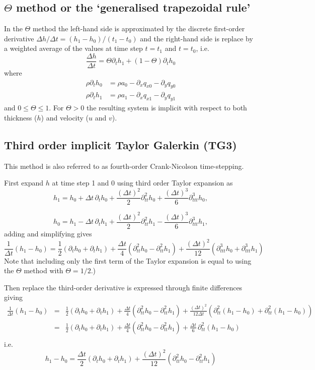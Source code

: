 \documentclass[10pt,a4paper]{book}
\newcommand{\p}{\partial}
\begin{document}
\subsection{$\Theta$ method or the `generalised trapezoidal rule'}

In the $\Theta$ method the left-hand side is approximated by the 
discrete first-order derivative $\Delta h/\Delta t=(h_1-h_0)/(t_1-t_0)$
and the right-hand side is replace by a weighted average of the values at time step $t=t_1$ and $t=t_0$, i.e.\
\[ \frac{\Delta h}{\Delta t}= \Theta \p_t h_1 +(1-\Theta) \p_t h_0  \]
where
\begin{align*}
\rho \p_t h_0&=\rho a_0-\p_x q_{x0} - \p_y q_{y0}\\
\rho \p_t h_1&=\rho a_1-\p_x q_{x1} - \p_y q_{y1}
\end{align*}
and $0 \le \Theta \le 1$. For $\Theta>0$ the resulting system is
implicit with respect to both thickness ($h$) and velocity ($u$ and
$v$).


\subsection{Third order implicit Taylor Galerkin (TG3)}
This method is also referred to as fourth-order Crank-Nicolson time-stepping.


First expand $h$ at time step 1 and 0 using third order Taylor expansion as
\[
h_1=h_0+ \Delta t \, \p_t h_0 + \frac{(\Delta t)^2}{2} \p^2_{tt} h_0 + \frac{(\Delta t)^3}{6} \p^3_{ttt} h_0 ,
\] 

\[
h_0=h_1- \Delta t \, \p_t h_1 + \frac{(\Delta t)^2}{2} \p^2_{tt} h_1  - \frac{(\Delta t)^3}{6} \p^3_{ttt} h_1,
\] 
adding and simplifying gives
\begin{equation}
\frac{1}{\Delta t}(h_1-h_0)= \frac{1}{2} (\p_t h_0+ \p_t h_1) + \frac{\Delta t}{4} (\p^2_{tt} h_0 - \p^2_{tt} h_1)
+\frac{(\Delta t)^2}{12} ( \p^3_{ttt} h_0 + \p^3_{ttt} h_1) 
\label{eq:fDt}
\end{equation}
Note that including  only the first term of the Taylor expansion is equal to using the $\Theta$ method with $\Theta=1/2$.)


Then replace the third-order derivative is expressed through finite differences giving
\begin{eqnarray*}
\frac{1}{\Delta t}(h_1-h_0)&=& 
\frac{1}{2} (\p_t h_0+ \p_t h_1) + \frac{\Delta t}{4} (\p^2_{tt} h_0 - \p^2_{tt} h_1) +\frac{(\Delta t)^2}{12 \Delta t} ( \p^2_{tt} (h_1-h_0) + \p^2_{tt} (h_1-h_0)) \\
&=& \frac{1}{2} (\p_t h_0+ \p_t h_1) + \frac{\Delta t}{4} (\p^2_{tt} h_0 - \p^2_{tt} h_1) +\frac{\Delta t}{6} \,\p^2_{tt} (h_1-h_0)  \\
\end{eqnarray*}
i.e.
\begin{equation}
h_1-h_0 =  \frac{\Delta t}{2} (\p_t h_0+ \p_t h_1) + \frac{(\Delta t)^2}{12} (\p^2_{tt} h_0 -\p^2_{tt} h_1)
\label{eq:three}
\end{equation}
 
\end{document}
